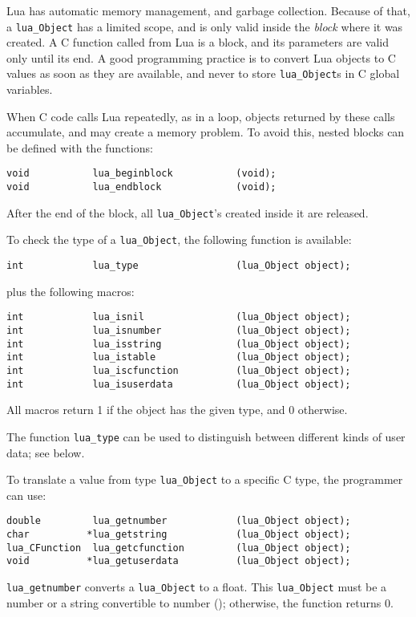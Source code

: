 Lua has automatic memory management, and garbage collection.
Because of that, a \verb'lua_Object' has a limited scope,
and is only valid inside the {\em block\/} where it was created.
A C function called from Lua is a block,
and its parameters are valid only until its end.
A good programming practice is to convert Lua objects to C values
as soon as they are available,
and never to store \verb'lua_Object's in C global variables.

When C code calls Lua repeatedly, as in a loop,
objects returned by these calls accumulate,
and may create a memory problem.
To avoid this,
nested blocks can be defined with the functions:
\begin{verbatim}
void           lua_beginblock           (void);
void           lua_endblock             (void);
\end{verbatim}
After the end of the block,
all \verb'lua_Object''s created inside it are released.

To check the type of a \verb'lua_Object',
the following function is available:
\begin{verbatim}
int            lua_type                 (lua_Object object);
\end{verbatim}
plus the following macros:
\begin{verbatim}
int            lua_isnil                (lua_Object object);
int            lua_isnumber             (lua_Object object);
int            lua_isstring             (lua_Object object);
int            lua_istable              (lua_Object object);
int            lua_iscfunction          (lua_Object object);
int            lua_isuserdata           (lua_Object object);
\end{verbatim}
All macros return 1 if the object has the given type,
and 0 otherwise.

The function \verb'lua_type' can be used to distinguish between
different kinds of user data; see below.

To translate a value from type \verb'lua_Object' to a specific C type,
the programmer can use:
\begin{verbatim}
double         lua_getnumber            (lua_Object object);
char          *lua_getstring            (lua_Object object);
lua_CFunction  lua_getcfunction         (lua_Object object);
void          *lua_getuserdata          (lua_Object object);
\end{verbatim}
\verb'lua_getnumber' converts a \verb'lua_Object' to a float.
This \verb'lua_Object' must be a number or a string convertible to number
(); otherwise, the function returns 0.


